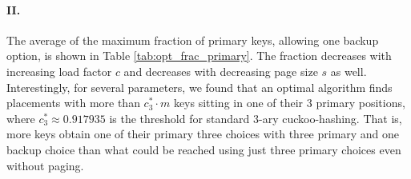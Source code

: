 \let\accentvec\vec \documentclass{llncs}
\begin{document}
\paragraph{II.}The average of the {maximum fraction of primary keys}, allowing one backup option, is shown in Table \ref{tab:opt_frac_primary}.
The fraction decreases with increasing load factor $c$ and decreases with decreasing page size $s$ as well.
Interestingly, for several parameters,
we found that an optimal algorithm finds placements with more than $c^*_3\cdot m$ keys sitting in one of their $3$ primary positions, where $c^*_3\approx0.917935$ is the threshold for standard $3$-ary cuckoo-hashing.
That is, more keys obtain one of their primary three choices with three primary and one backup choice than what could be reached using just three primary choices even without paging.   
\end{document}
